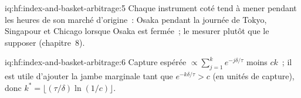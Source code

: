 \begin{solution}{iq:hf:index-and-basket-arbitrage:5}
Chaque instrument coté tend à mener pendant les heures de son marché d'origine~: Osaka pendant la journée de Tokyo, Singapour et Chicago lorsque Osaka est fermée~; le mesurer plutôt que
le supposer (chapitre~8).
\end{solution}

\begin{solution}{iq:hf:index-and-basket-arbitrage:6}
Capture espérée $\propto\sum_{j=1}^{k}e^{-j\delta/\tau}$ moins $ck$~; il est utile d'ajouter la jambe marginale tant que $e^{-k\delta/\tau}>c$ (en
unités de capture), donc $k^\ast=\lfloor(\tau/\delta)\ln(1/c)\rfloor$.
\end{solution}
